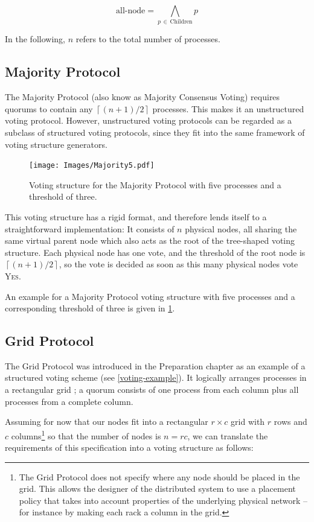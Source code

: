 \documentclass[12pt,chapterprefix=true,toc=bibliography,numbers=noendperiod,
               footnotes=multiple,twoside]{scrreprt}
\newcommand{\yes}{{\fontfamily{jkposn}\selectfont\textsc{Yes}}}
\begin{document}
\[ \text{all-node} = \bigwedge_{p\,\in\,\text{Children}} p \]

In the following, \(n\) refers to the total number of processes.

\subsection{Majority Protocol}
\label{ssc:majority}

The Majority Protocol (also know as Majority Consensus Voting\autocite{majority}) requires quorums to contain any \(\left\lceil (n + 1) / 2 \right\rceil\) processes. This makes it an unstructured voting protocol. However, unstructured voting protocols can be regarded as a subclass of structured voting protocols, since they fit into the same framework of voting structure generators.

\begin{figure}[h]
    \centering
    \texttt{[image: Images/Majority5.pdf]}
    \caption{Voting structure for the Majority Protocol with five processes and a threshold of three.}
    \label{fig:majority5-struct}
\end{figure}

This voting structure has a rigid format, and therefore lends itself to a straightforward implementation: It consists of \(n\) physical nodes, all sharing the same virtual parent node which also acts as the root of the tree-shaped voting structure. Each physical node has one vote, and the threshold of the root node is \(\left\lceil (n + 1) / 2 \right\rceil\), so the vote is decided as soon as this many physical nodes vote \yes.

An example for a Majority Protocol voting structure with five processes and a corresponding threshold of three is given in \cref{fig:majority5-struct}.

\subsection{Grid Protocol}
\label{ssc:grid}

The Grid Protocol was introduced in the Preparation chapter as an example of a structured voting scheme (see \cref{voting-example}). It logically arranges processes in a rectangular grid \autocite{grid}; a quorum consists of one process from each column plus all processes from a complete column.

Assuming for now that our nodes fit into a rectangular \(r \times c\) grid with \(r\) rows and \(c\) columns\footnote{The Grid Protocol does not specify where any node should be placed in the grid. This allows the designer of the distributed system to use a placement policy that takes into account properties of the underlying physical network -- for instance by making each rack a column in the grid.} so that the number of nodes is \(n = r c\), we can translate the requirements of this specification into a voting structure as follows:
\end{document}
